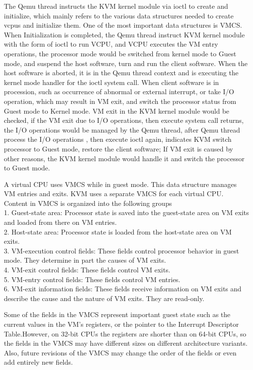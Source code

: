 \documentclass[10pt,draftclsnofoot,peerreview,letterpaper,onecolumn,]{IEEEtran}
\begin{document}
The Qemu thread instructs the KVM kernel module via ioctl to create and initialize, which mainly refers to the various data structures needed to create vcpus and initialize them. One of the most important data structures is VMCS. When Initialization is completed, the Qemu thread instruct KVM kernel module with the form of ioctl to run VCPU, and VCPU executes the VM entry operations, the processor mode would be switched from kernel mode to Guest mode, and suspend the host software, turn and run the client software. When the host software is aborted, it is in the Qemu thread context and is executing the kernel mode handler for the ioctl system call. When client software is in procession, such as occurrence of abnormal or external interrupt, or take  I/O operation, which may result in VM exit, and switch the processor status from Guest mode to Kernel mode. VM exit in the KVM kernel module would be checked, if the VM exit due to I/O operations, then execute system call returns, the I/O operations would be managed by the Qemu thread, after Qemu thread process the I/O operations , then execute ioctl again, indicates  KVM switch processor to Guest mode, restore the client software; If VM exit is caused by other reasons, the KVM kernel module would handle it and switch the processor to Guest mode.

A virtual CPU uses VMCS while in guest mode. This data structure manages VM entries and exits. KVM uses a separate VMCS for each virtual CPU. Content in VMCS is organized into the following groups
~\\1. Guest-state area: Processor state is saved into the guest-state area on VM exits and loaded from there on VM entries.
~\\2. Host-state area: Processor state is loaded from the host-state area on VM exits.
~\\3. VM-execution control fields: These fields control processor behavior in guest mode. They determine in part the causes of VM exits.
~\\4. VM-exit control fields: These fields control VM exits.
~\\5. VM-entry control fields: These fields control VM entries.
~\\6. VM-exit information fields: These fields receive information on VM exits and describe the cause and the nature of VM exits. They are read-only.

Some of the fields in the VMCS represent important guest state such as the current values in the VM’s registers, or the pointer to the Interrupt Descriptor Table.However, on 32-bit CPUs the registers are shorter than on 64-bit CPUs, so the fields in the VMCS may have different sizes on different architecture variants. Also, future revisions of the VMCS may change the order of the fields or even add entirely new fields.
\end{document}
